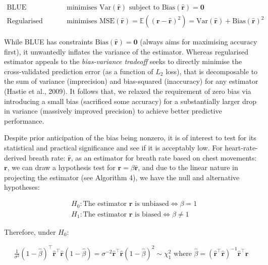 \documentclass[
]{article}
\begin{document}
\begin{align*}
  \text{BLUE }&\text{minimises Var} (\mathbf{\hat{r}}) \text{ subject to Bias} (\mathbf{\hat{r}}) = \mathbf{0} \\
  \text{Regularised estimator }&\text{minimises MSE} (\mathbf{\hat{r}}) = \mathbb{E}((\mathbf{r} - \mathbf{\hat{r}})^2) = \text{Var}(\mathbf{\hat{r}}) + \text{Bias}(\mathbf{\hat{r}})^2
\end{align*}

While BLUE has constraints
\(\text{Bias}(\mathbf{\hat{r}}) = \mathbf{0}\) (always aims for
maximising accuracy first), it unwantedly inflates the variance of the
estimator. Whereas regularised estimator appeals to the
\emph{bias-variance tradeoff} seeks to directly minimise the
cross-validated prediction error (as a function of \(L_2\) loss), that
is decomposable to the sum of variance (imprecision) and bias-squared
(inaccuracy) for any estimator (Hastie et al., 2009). It follows that,
we relaxed the requirement of zero bias via introducing a small bias
(sacrificed some accuracy) for a substantially larger drop in variance
(massively improved precision) to achieve better predictive performance.

Despite prior anticipation of the bias being nonzero, it is of interest
to test for its statistical and practical significance and see if it is
acceptably low. For heart-rate-derived breath rate:
\(\mathbf{\hat{r}}\), as an estimator for breath rate based on chest
movements: \(\mathbf{r}\), we can draw a hypothesis test for
\(\mathbf{r} = \beta\mathbf{\hat{r}}\), and due to the linear nature in
projecting the estimator (see Algorithm 4), we have the null and
alternative hypotheses:

\begin{align*}
  &H_0: \text{The estimator } \mathbf{\hat{r}} \text{ is unbiased} \iff \beta = 1 \\
  &H_1: \text{The estimator } \mathbf{\hat{r}} \text{ is biased} \iff \beta \neq 1
\end{align*}

Therefore, under \(H_0:\)

\begin{align*}
  \frac{1}{\sigma^2}(1 - \hat{\beta})^\top\mathbf{\hat{r}}^\top\mathbf{\hat{r}}(1 - \hat{\beta}) = \sigma^{-2}\mathbf{\hat{r}}^\top\mathbf{\hat{r}}(1 - \hat{\beta})^2 \sim \chi_1^2 \text{ where } \hat{\beta} = (\mathbf{\hat{r}}^\top\mathbf{\hat{r}})^{-1}\mathbf{\hat{r}}^\top\mathbf{r}
\end{align*}
\end{document}
